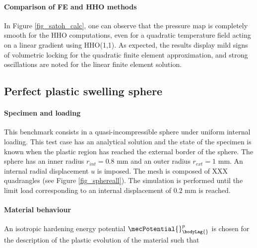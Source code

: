 \paragraph{Comparison of FE and HHO methods}

In Figure \ref{fig_satoh_calc}, one can observe that the pressure map is completely smooth for the HHO computations, even for a quadratic temperature field acting on a linear gradient using HHO(1,1). As expected, the results display mild signs of volumetric locking for the quadratic finite element
approximation, and strong oscillations are noted for the linear finite element solution.

\subsection{Perfect plastic swelling sphere}
\label{sec_swelling_sphere}

\paragraph{Specimen and loading}

This benchmark consists in a quasi-incompressible sphere under uniform internal loading.
This test case has an analytical solution and the state of the specimen is known when the plastic region has reached the external border of the sphere.
The sphere has an inner radius $r_{int} = 0.8$ mm and an outer
radius $r_{ext} = 1$ mm. An internal radial displacement $u$ is imposed. The mesh is composed of XXX quadrangles (see Figure \ref{fig_sphereall}).
The simulation is performed until the limit load corresponding to an internal displacement of $0.2$ mm is reached.

\paragraph{Material behaviour}

An isotropic hardening energy potential $\mecPotential{}_{\bodyLag{}}^p$ is chosen for the description of the plastic evolution of the material such that

